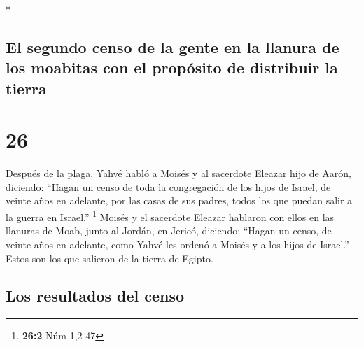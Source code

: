 \begin{paracol}{2}
\begin{otherlanguage}{english}
\end{otherlanguage}

\switchcolumn[0]*

\hypertarget{el-segundo-censo-de-la-gente-en-la-llanura-de-los-moabitas-con-el-propuxf3sito-de-distribuir-la-tierra}{%
\subsection{El segundo censo de la gente en la llanura de los moabitas
con el propósito de distribuir la
tierra}\label{el-segundo-censo-de-la-gente-en-la-llanura-de-los-moabitas-con-el-propuxf3sito-de-distribuir-la-tierra}}

\hypertarget{section-50}{%
\section{26}\label{section-50}}

 Después de la plaga, Yahvé habló a Moisés y al sacerdote
Eleazar hijo de Aarón, diciendo:  ``Hagan un censo de toda
la congregación de los hijos de Israel, de veinte años en adelante, por
las casas de sus padres, todos los que puedan salir a la guerra en
Israel.'' \footnote{\textbf{26:2} Núm 1,2-47}  Moisés y el
sacerdote Eleazar hablaron con ellos en las llanuras de Moab, junto al
Jordán, en Jericó, diciendo:  ``Hagan un censo, de veinte
años en adelante, como Yahvé les ordenó a Moisés y a los hijos de
Israel.'' Estos son los que salieron de la tierra de Egipto.

\hypertarget{los-resultados-del-censo-1}{%
\subsection{Los resultados del censo}\label{los-resultados-del-censo-1}}


\end{paracol}
